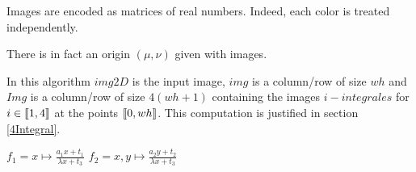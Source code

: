 


Images are encoded as matrices of real numbers. Indeed, each color is treated independently.

There is in fact an origin $(\mu,\nu)$ given with images.



In this algorithm $img2D$ is the input image, $img$ is a column/row of size $wh$ and $Img$ is a column/row of size $4(wh+1)$ containing the images $i-integrales$ for $i\in \llbracket 1,4 \rrbracket $ at the points $\llbracket 0,wh \rrbracket$. This computation is justified in section \ref{4Integral}.



\begin{algorithm}[H]
\caption{$applyHomography(img,imgf,H)$}
$f_1 = x\mapsto \frac{a_1x + t_1}{\lambda x + t_3}$ \;
$f_2 = x,y\mapsto \frac{a_2y + t_2}{\lambda x + t_3}$ \;

\end{algorithm}



